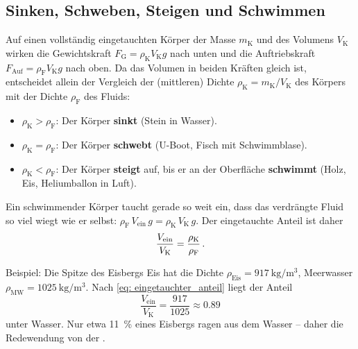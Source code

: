 \subsection{Sinken, Schweben, Steigen und Schwimmen}
Auf einen vollständig eingetauchten Körper der Masse $m_\text{K}$ und des Volumens $V_\text{K}$ wirken die Gewichtskraft $F_\text{G} = \rho_\text{K} V_\text{K} g$ nach unten und die Auftriebskraft $F_\text{Auf} = \rho_\text{F} V_\text{K} g$ nach oben. Da das Volumen in beiden Kräften gleich ist, entscheidet allein der Vergleich der (mittleren) Dichte $\rho_\text{K} = m_\text{K}/V_\text{K}$ des Körpers mit der Dichte $\rho_\text{F}$ des Fluids:
\begin{itemize}[itemsep=1.5pt]
    \item $\rho_\text{K} > \rho_\text{F}$: Der Körper \textbf{sinkt} (Stein in Wasser).
    \item $\rho_\text{K} = \rho_\text{F}$: Der Körper \textbf{schwebt} (U-Boot, Fisch mit Schwimmblase).
    \item $\rho_\text{K} < \rho_\text{F}$: Der Körper \textbf{steigt} auf, bis er an der Oberfläche \textbf{schwimmt} (Holz, Eis, Heliumballon in Luft).
\end{itemize}
Ein schwimmender Körper taucht gerade so weit ein, dass das verdrängte Fluid so viel wiegt wie er selbst: $\rho_\text{F}\, V_\text{ein}\, g = \rho_\text{K}\, V_\text{K}\, g$. Der eingetauchte Anteil ist daher
\begin{equation}\label{eq: eingetauchter_anteil}
    \frac{V_\text{ein}}{V_\text{K}} = \frac{\rho_\text{K}}{\rho_\text{F}} \,.
\end{equation}

\begin{examplebox}[]{Beispiel: Die Spitze des Eisbergs}
    Eis hat die Dichte $\rho_\text{Eis} = \SI{917}{\kilogram\per\meter\cubed}$, Meerwasser $\rho_\text{MW} = \SI{1025}{\kilogram\per\meter\cubed}$. Nach \cref{eq: eingetauchter_anteil} liegt der Anteil
    \begin{equation*}
        \frac{V_\text{ein}}{V_\text{K}} = \frac{917}{1025} \approx \num{0.89}
    \end{equation*}
    unter Wasser. Nur etwa \SI{11}{\percent} eines Eisbergs ragen aus dem Wasser -- daher die Redewendung von der .
\end{examplebox}

